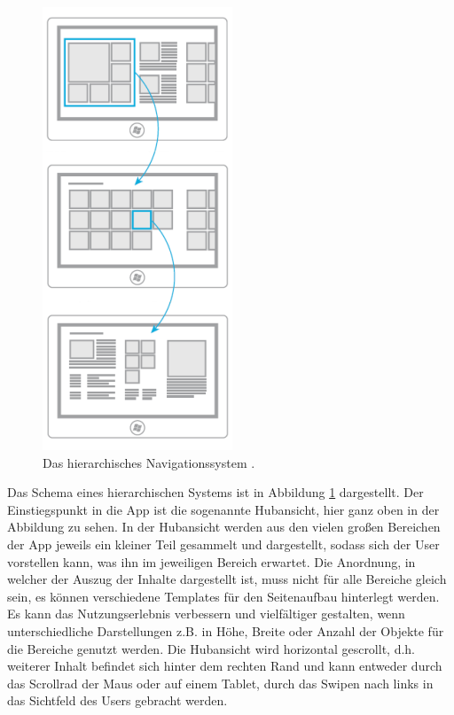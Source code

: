 \documentclass[12pt,a4paper,bibtotoc,abstracton]{scrartcl}
\begin{document}
\begin{figure}[h]	
	\centering
	\includegraphics[scale=1]{Bilder/Abbildungen/ms_navigation_hierarchie} 
	\caption[Das flache Navigationssystem]{Das hierarchisches Navigationssystem \protect\citep{MicrosoftNavidesign2013}.}
	\label{fig:navihierarchisch}
\end{figure}

Das Schema eines hierarchischen Systems ist in Abbildung \ref{fig:navihierarchisch} dargestellt. Der Einstiegspunkt in die App ist die sogenannte \glqq Hubansicht\grqq, hier ganz oben in der Abbildung zu sehen. In der Hubansicht werden aus den vielen großen Bereichen der App jeweils ein kleiner Teil gesammelt und dargestellt, sodass sich der User vorstellen kann, was ihn im jeweiligen Bereich erwartet. Die Anordnung, in welcher der Auszug der Inhalte dargestellt ist, muss nicht für alle Bereiche gleich sein, es können verschiedene Templates für den Seitenaufbau hinterlegt werden. Es kann das Nutzungserlebnis verbessern und vielfältiger gestalten, wenn unterschiedliche Darstellungen z.B. in Höhe, Breite oder Anzahl der Objekte für die Bereiche genutzt werden. Die Hubansicht wird horizontal gescrollt, d.h. weiterer Inhalt befindet sich hinter dem rechten Rand und kann entweder durch das Scrollrad der Maus oder auf einem Tablet, durch das Swipen nach links in das Sichtfeld des Users gebracht werden.
\end{document}
